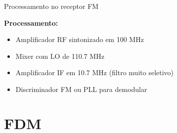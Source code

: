 
\begin{frame}{Processamento no receptor FM}

\textbf{Processamento:}
\begin{itemize}
\item Amplificador RF sintonizado em 100 MHz
\item Mixer com LO de 110.7 MHz
\item Amplificador IF em 10.7 MHz (filtro muito seletivo)
\item Discriminador FM ou PLL para demodular
\end{itemize}

\end{frame}


\section{FDM}

